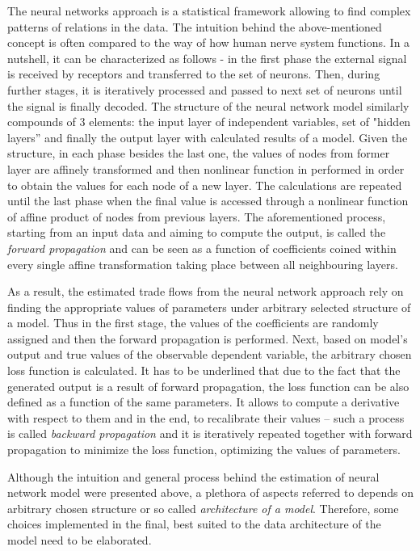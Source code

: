 \documentclass{Trade_template}
\numberwithin{equation}{section}
\begin{document}
The neural networks approach is a statistical framework allowing to find complex patterns of relations in the data. The intuition behind the above-mentioned concept is often compared to the way of how human nerve system functions. In a nutshell, it can be characterized as follows - in the first phase the external signal is received by receptors and transferred to the set of neurons. Then, during further stages, it is iteratively processed and passed to next set of neurons until the signal is finally decoded. The structure of the neural network model similarly compounds of 3 elements: the input layer of independent variables, set of "hidden layers” and finally the output layer with calculated results of a model. Given the structure, in each phase besides the last one, the values of nodes from former layer are affinely transformed and then nonlinear function in performed in order to obtain the values for each node of a new layer. The calculations are repeated until the last phase when the final value is accessed through a nonlinear function of affine product of nodes from previous layers. The aforementioned process, starting from an input data and aiming to compute the output, is called the \textit{forward propagation} and can be seen as a function of coefficients coined within every single affine transformation taking place between all neighbouring layers.

As a result, the estimated trade flows from the neural network approach rely on finding the appropriate values of parameters under arbitrary selected structure of a model. Thus in the first stage, the values of the coefficients are randomly assigned and then the forward propagation is performed. Next, based on model’s output and true values of the observable dependent variable, the arbitrary chosen loss function is calculated. It has to be underlined that due to the fact that the generated output is a result of forward propagation, the loss function can be also defined as a function of the same parameters. It allows to compute a derivative with respect to them and in the end, to recalibrate their values – such a process is called  \textit{backward propagation} and it is iteratively repeated together with forward propagation to minimize the loss function, optimizing the values of parameters. 

Although the intuition and general process behind the estimation of neural network model were presented above, a plethora of aspects referred to depends on arbitrary chosen structure or so called \textit{architecture of a model}. Therefore, some choices implemented in the final, best suited to the data architecture of the model need to be elaborated.
\end{document}
